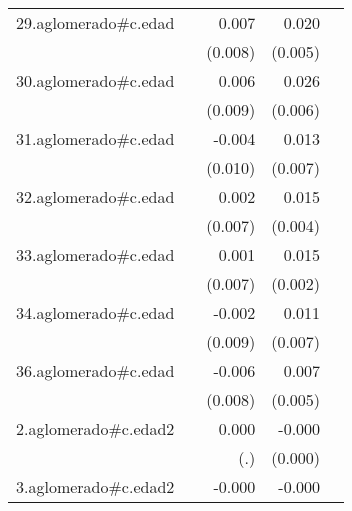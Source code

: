 {\begin{longtable}{l*{4}{D{.}{.}{-1}}}
\addlinespace
29.aglomerado#c.edad&                     &       0.007         &       0.020\sym{***}&                     \\
            &                     &     (0.008)         &     (0.005)         &                     \\
\addlinespace
30.aglomerado#c.edad&                     &       0.006         &       0.026\sym{***}&                     \\
            &                     &     (0.009)         &     (0.006)         &                     \\
\addlinespace
31.aglomerado#c.edad&                     &      -0.004         &       0.013         &                     \\
            &                     &     (0.010)         &     (0.007)         &                     \\
\addlinespace
32.aglomerado#c.edad&                     &       0.002         &       0.015\sym{***}&                     \\
            &                     &     (0.007)         &     (0.004)         &                     \\
\addlinespace
33.aglomerado#c.edad&                     &       0.001         &       0.015\sym{***}&                     \\
            &                     &     (0.007)         &     (0.002)         &                     \\
\addlinespace
34.aglomerado#c.edad&                     &      -0.002         &       0.011         &                     \\
            &                     &     (0.009)         &     (0.007)         &                     \\
\addlinespace
36.aglomerado#c.edad&                     &      -0.006         &       0.007         &                     \\
            &                     &     (0.008)         &     (0.005)         &                     \\
\addlinespace
2.aglomerado#c.edad2&                     &       0.000         &      -0.000         &                     \\
            &                     &         (.)         &     (0.000)         &                     \\
\addlinespace
3.aglomerado#c.edad2&                     &      -0.000         &      -0.000\sym{***}&                     \\

\end{longtable}}
